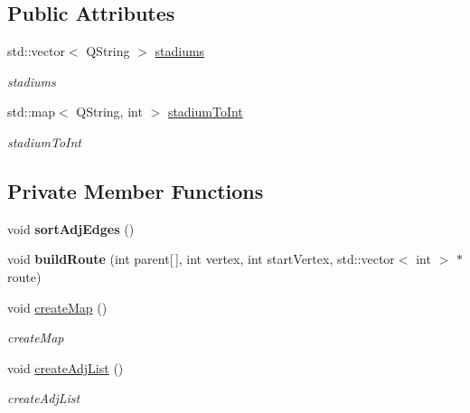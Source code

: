 \subsection*{Public Attributes}
\begin{DoxyCompactItemize}
\item 
\mbox{\label{class_graph_a90ae3fa378893d9cc43473597defbb3a}} 
std\+::vector$<$ Q\+String $>$ \hyperlink{class_graph_a90ae3fa378893d9cc43473597defbb3a}{stadiums}
\begin{DoxyCompactList}\small\item\em stadiums \end{DoxyCompactList}\item 
\mbox{\label{class_graph_ad4fcb87e949e128b64078ae7e0651363}} 
std\+::map$<$ Q\+String, int $>$ \hyperlink{class_graph_ad4fcb87e949e128b64078ae7e0651363}{stadium\+To\+Int}
\begin{DoxyCompactList}\small\item\em stadium\+To\+Int \end{DoxyCompactList}\end{DoxyCompactItemize}
\subsection*{Private Member Functions}
\begin{DoxyCompactItemize}
\item 
\mbox{\label{class_graph_a8550df649cebefb83add0f55dafc14d0}} 
void {\bfseries sort\+Adj\+Edges} ()
\item 
\mbox{\label{class_graph_a1c6f38569b976af300a4ef9dbae11e83}} 
void {\bfseries build\+Route} (int parent\mbox{[}$\,$\mbox{]}, int vertex, int start\+Vertex, std\+::vector$<$ int $>$ $\ast$route)
\item 
\mbox{\label{class_graph_afb7f735fa487ed19ce46c4a813f41a71}} 
void \hyperlink{class_graph_afb7f735fa487ed19ce46c4a813f41a71}{create\+Map} ()
\begin{DoxyCompactList}\small\item\em create\+Map \end{DoxyCompactList}\item 
\mbox{\label{class_graph_acfb46802d780b76a85061be77c441602}} 
void \hyperlink{class_graph_acfb46802d780b76a85061be77c441602}{create\+Adj\+List} ()
\begin{DoxyCompactList}\small\item\em create\+Adj\+List \end{DoxyCompactList}\end{DoxyCompactItemize}
